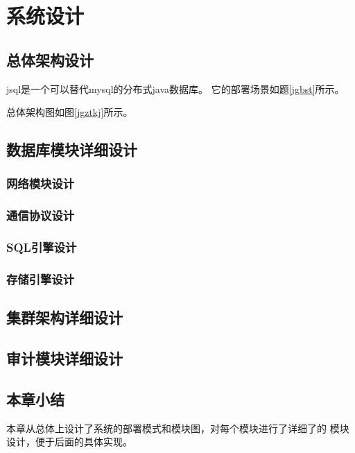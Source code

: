 
\chapter{系统设计}
\section{总体架构设计}
jsql是一个可以替代mysql的分布式java数据库。
它的部署场景如题\ref{jgbst}所示。

总体架构图如图\ref{jgztkj}所示。
\section{数据库模块详细设计}
\subsection{网络模块设计}
\subsection{通信协议设计}
\subsection{SQL引擎设计}
\subsection{存储引擎设计}
\section{集群架构详细设计}
\section{审计模块详细设计}
\section{本章小结}
本章从总体上设计了系统的部署模式和模块图，对每个模块进行了详细了的
模块设计，便于后面的具体实现。